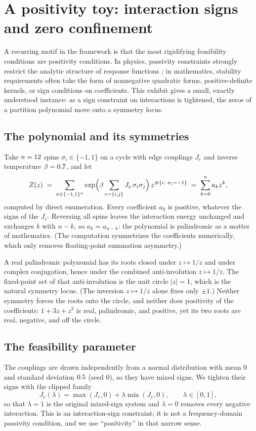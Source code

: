 \section{A positivity toy: interaction signs and zero confinement}
\label{sec:exhibit-passivity}

A recurring motif in the framework is that the most rigidifying feasibility conditions are positivity conditions.
In physics, passivity constraints strongly restrict the analytic structure of response functions \cite{Willems1972II}; in mathematics, stability requirements often take the form of nonnegative quadratic forms, positive-definite kernels, or sign conditions on coefficients.
This exhibit gives a small, exactly understood instance: as a sign constraint on interactions is tightened, the zeros of a partition polynomial move onto a symmetry locus.

\subsection{The polynomial and its symmetries}
Take $n=12$ spins $\sigma_i\in\{-1,1\}$ on a cycle with edge couplings $J_e$ and inverse temperature $\beta=0.7$, and let
\[
  Z(z)\;=\;\sum_{\sigma\in\{-1,1\}^n}\exp\Bigl(\beta\sum_{e=\{i,j\}}J_e\,\sigma_i\sigma_j\Bigr)\,z^{\#\{i:\ \sigma_i=-1\}}\;=\;\sum_{k=0}^{n}a_k z^k,
\]
computed by direct enumeration.
Every coefficient $a_k$ is positive, whatever the signs of the $J_e$.
Reversing all spins leaves the interaction energy unchanged and exchanges $k$ with $n-k$, so $a_k=a_{n-k}$: the polynomial is palindromic as a matter of mathematics.
(The computation symmetrizes the coefficients numerically, which only removes floating-point summation asymmetry.)

A real palindromic polynomial has its roots closed under $z\mapsto 1/z$ and under complex conjugation, hence under the combined anti-involution $z\mapsto 1/\bar z$.
The fixed-point set of that anti-involution is the unit circle $|z|=1$, which is the natural symmetry locus.
(The inversion $z\mapsto 1/z$ alone fixes only $\pm 1$.)
Neither symmetry forces the roots onto the circle, and neither does positivity of the coefficients: $1+3z+z^2$ is real, palindromic, and positive, yet its two roots are real, negative, and off the circle.

\subsection{The feasibility parameter}
The couplings are drawn independently from a normal distribution with mean $0$ and standard deviation $0.5$ (seed $0$), so they have mixed signs.
We tighten their signs with the clipped family
\[
  J_e(\lambda)=\max(J_e,0)+\lambda\min(J_e,0),\qquad\lambda\in[0,1],
\]
so that $\lambda=1$ is the original mixed-sign system and $\lambda=0$ removes every negative interaction.
This is an interaction-sign constraint; it is not a frequency-domain passivity condition, and we use ``positivity'' in that narrow sense.

